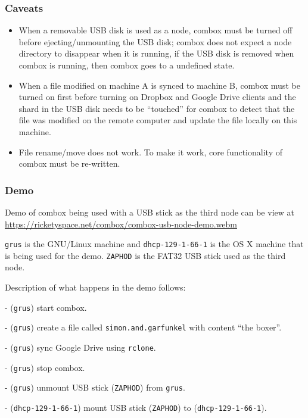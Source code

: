 \subsubsection{Caveats}

\begin{itemize}
\item When a removable USB disk is used as a node, combox must be
  turned off before ejecting/unmounting the USB disk; combox does not
  expect a node directory to disappear when it is running, if the USB
  disk is removed when combox is running, then combox goes to a
  undefined state.

\item When a file modified on machine A is synced to machine B, combox
  must be turned on first before turning on Dropbox and Google Drive
  clients and the shard in the USB disk needs to be ``touched'' for
  combox to detect that the file was modified on the remote computer
  and update the file locally on this machine.

\item File rename/move does not work. To make it work, core
  functionality of combox must be re-written.
\end{itemize}

\subsubsection{Demo}

Demo of combox being used with a USB stick as the third node can be
view at \url{https://ricketyspace.net/combox/combox-usb-node-demo.webm}

\verb+grus+ is the GNU/Linux machine and \verb+dhcp-129-1-66-1+ is the
OS X machine that is being used for the demo. \verb+ZAPHOD+ is the
FAT32 USB stick used as the third node.

Description of what happens in the demo follows:

  - (\verb+grus+) start combox.

  - (\verb+grus+) create a file called \verb+simon.and.garfunkel+ with
  content ``the boxer''.

  - (\verb+grus+) sync Google Drive using \verb+rclone+.

  - (\verb+grus+) stop combox.

  - (\verb+grus+) unmount USB stick (\verb+ZAPHOD+) from \verb+grus+.

  - (\verb+dhcp-129-1-66-1+) mount USB stick (\verb+ZAPHOD+) to
  (\verb+dhcp-129-1-66-1+).

